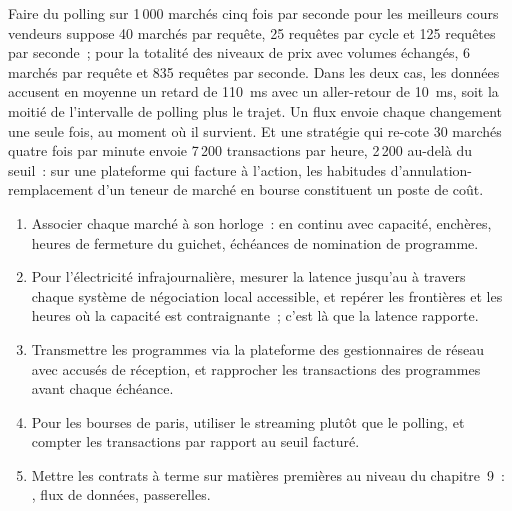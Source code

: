 \label{lst:nw:power-commodities-and-betting-connectivity:poll}

Faire du polling sur 1\,000 marchés cinq fois par seconde pour les meilleurs cours vendeurs suppose 40 marchés par requête, 25 requêtes par cycle et 125 requêtes par seconde~; pour
la totalité des niveaux de prix avec volumes échangés, 6 marchés par requête et 835 requêtes par seconde. Dans les deux cas, les données accusent en moyenne
un retard de \qty{110}{\milli\second} avec un aller-retour de \qty{10}{\milli\second}, soit la moitié de l'intervalle de polling plus le trajet. Un flux envoie chaque
changement une seule fois, au moment où il survient. Et une stratégie qui re-cote 30 marchés quatre fois par minute envoie 7\,200 transactions par heure, 2\,200 au-delà
du seuil~: sur une plateforme qui facture à l'action, les habitudes d'annulation-remplacement d'un teneur de marché en bourse constituent un poste de coût.

\begin{method}\label{met:nw:power-commodities-and-betting-connectivity:plan}
\begin{enumerate}
\item Associer chaque marché à son horloge~: en continu avec capacité, enchères, heures de fermeture du guichet, échéances de nomination de programme.
\item Pour l'électricité infrajournalière, mesurer la latence jusqu'au  à travers chaque système de négociation local accessible, et repérer les frontières
  et les heures où la capacité est contraignante~; c'est là que la latence rapporte.
\item Transmettre les programmes via la plateforme des gestionnaires de réseau avec accusés de réception, et rapprocher les transactions des programmes avant chaque
  échéance.
\item Pour les bourses de paris, utiliser le streaming plutôt que le polling, et compter les transactions par rapport au seuil facturé.
\item Mettre les contrats à terme sur matières premières au niveau du chapitre~9~: , flux de données, passerelles.
\end{enumerate}
\end{method}

